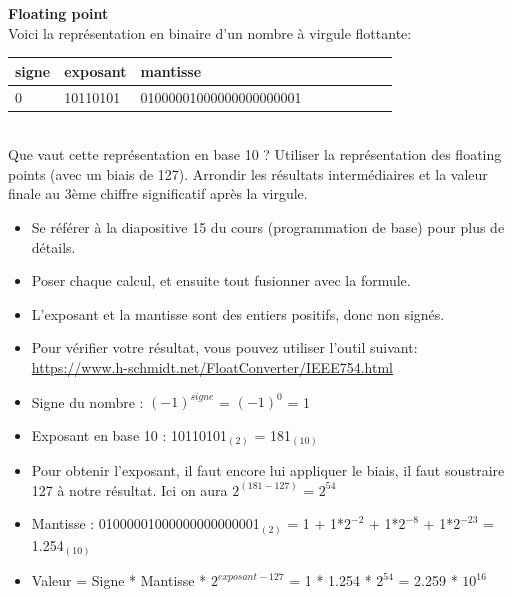 \begin{Exercice}[10 minutes] \textbf{Floating point}\\
    
    Voici la représentation en binaire d'un nombre à virgule flottante: \\
    
     \begin{tabular}{| p{1cm} | p{3cm} | p{9.5cm} | p{1cm} | p{1cm} | p{1cm} | p{1cm} | p{1cm} | p{1cm} |} 
            \hline
            signe & exposant & mantisse \\ [0.5ex] 
            \hline
            0 & 10110101 & 01000001000000000000001 \\ [0.5ex]
            \hline
	\end{tabular}
	\\
    Que vaut cette représentation en base 10 ? Utiliser la représentation des floating points (avec un biais de 127). Arrondir les résultats intermédiaires et la valeur finale au 3ème chiffre significatif après la virgule. \\
	
    \begin{conseil}
    
    \begin{itemize}
    	\item Se référer à la diapositive 15 du cours (programmation de base) pour plus de détails.
    	\item Poser chaque calcul, et ensuite tout fusionner avec la formule.
    	\item L'exposant et la mantisse sont des entiers positifs, donc non signés.
    	\item Pour vérifier votre résultat, vous pouvez utiliser l'outil suivant: \url{https://www.h-schmidt.net/FloatConverter/IEEE754.html}
    \end{itemize}
    
    \end{conseil}
    
    \begin{solution}
        \begin{itemize}
        	\item Signe du nombre : $(-1)^{signe}$ = $(-1)^0$ = 1
        	\item Exposant en base 10 : 10110101$_{(2)}$ = 181$_{(10)}$
        	\item Pour obtenir l'exposant, il faut encore lui appliquer le biais, il faut soustraire 127 à notre résultat. Ici on aura $2^{(181-127)}$ = $2^{54}$
        	\item Mantisse : 01000001000000000000001$_{(2)}$ = 1 + 1*$2^{-2}$ + 1*$2^{-8}$ + 1*$2^{-23}$ = 1.254$_{(10)}$
        	\item Valeur = Signe * Mantisse * $2^{exposant-127}$ = 1 * 1.254 * $2^{54}$ = 2.259 * $10^{16}$
        \end{itemize}
    \end{solution}
\end{Exercice}
\newpage

